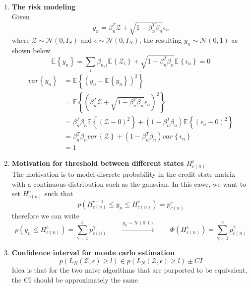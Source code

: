 \documentclass[11pt]{article}
\begin{document}
\renewcommand{\norm}[1]{\left\lVert#1\right\rVert}
\renewcommand{\E}[2][]{\mathbb{E}_{#1}\left\{#2\right\}}
\newcommand{\var}[2][]{var_{#1}\left\{#2\right\}}
\newcommand{\cov}[1]{cov\{#1\}} 
\newcommand{\normal}[1]{\mathcal{N}\left(#1\right)}
\newcommand{\exponents}[1]{exp\left\{#1\right\}}
\newcommand{\indicator}[1]{\mathbbm{1}_{#1}}

\newcommand{\bmu}{\boldsymbol{\mu}}
\newcommand{\bpi}{\boldsymbol{\pi}}
\newcommand{\bTheta}{\boldsymbol{\Theta}}
\newcommand{\bSigma}{\boldsymbol{\Sigma}}
\newcommand{\bphi}{\boldsymbol{\phi}}

\newcommand{\calA}{\mathcal{A}}
\newcommand{\calL}{\mathcal{L}}
\newcommand{\calE}{\mathcal{E}}
\newcommand{\calR}{\mathcal{R}}
\newcommand{\calC}{\mathcal{C}}
\newcommand{\calD}{\mathcal{D}}
\newcommand{\calZ}{\mathcal{Z}}
\newcommand{\bx}{\matr{x}}
\newcommand{\bt}{\matr{t}}
\newcommand{\bw}{\matr{w}}
\newcommand{\bX}{\matr{X}}
\newcommand{\bZ}{\matr{Z}}
\newcommand{\bz}{\matr{z}}
\newcommand{\bu}{\matr{u}}



\begin{enumerate}
    \item \textbf{The risk modeling} \\
    Given 
    \[
        y_n = \beta_n^T \calZ + \sqrt{1 - \beta_n^T \beta_n} \epsilon_n
    \]
    where $\calZ \sim \normal{0, I_S}$ and $\epsilon \sim \normal{0, I_N}$, the resulting $y_n \sim \normal{0,1}$ as shown below 
    \[
        \E{y_n} = \sum_{i} \beta_{n,i} \E{\calZ_i} + \sqrt{1 - \beta_n^T \beta_n} \E{\epsilon_n} = 0
    \]
    \begin{align*}
        \var{y_n} 
        &= \E{(y_n - \E{y_n})^2} \\
        &= \E{ (\beta_n^T \calZ + \sqrt{1 - \beta_n^T \beta_n} \epsilon_n)^2 }\\
        &= \beta_n^T \beta_n \E{(\calZ - 0)^2} + (1-\beta_n^T \beta_n) \E{(\epsilon_n - 0)^2} \\
        &= \beta_n^T \beta_n \var{\calZ} + (1-\beta_n^T \beta_n) \var{\epsilon_n} \\
        &= 1
    \end{align*}
    \item \textbf{Motivation for threshold between different states $H_{c(n)}^c$} \\
    The motivation is to model discrete probability in the credit state matrix with a continuous distribution such as the gaussian. In this cawe, we want to set $H_{c(n)}^c$ such that
    \[
        p(H_{c(n)}^{c-1}\leq y_n \leq H_{c(n)}^c) = p_{c(n)}^c
    \]
    therefore we can write 
    \[
        p(y_n \leq H_{c(n)}^c) = \sum_{\gamma = 1}^c p_{c(n)}^{\gamma}
        \qquad 
        \overset{y_n \sim \normal{0,1}}{\longrightarrow} 
        \qquad 
        \Phi(H_{c(n)}^c) = \sum_{\gamma = 1}^c p_{c(n)}^{\gamma}
    \]
    \item \textbf{Confidence interval for monte carlo estimation}
    \[
        p(L_N(\calZ, \epsilon)\geq l) \in 
        p(L_N(\calZ, \epsilon)\geq l) \pm CI
    \]
    Idea is that for the two naive algorithms that are purported to be equivalent, the CI should be approximately the same
\end{enumerate}
\end{document}
